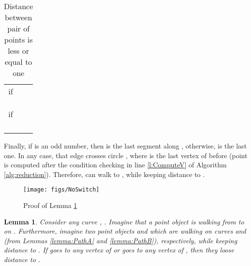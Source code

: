 \documentclass[12pt]{dalthesis}
\def\favoritefont{\bfseries \sffamily}
\def\QED{\ensuremath{{\Box}}}
\def\markatright#1{\leavevmode\unskip\nobreak\quad\hspace*{\fill}{#1}}
\newenvironment{proof}
	{\begin{trivlist}\item[\hskip\labelsep{\favoritefont Proof:}]}
	{\markatright{\QED}\end{trivlist}}
\newtheorem{lemma}[theorem]{Lemma}
\newcommand{\qed}{}
\begin{document}
\begin{proof}
\begin{table}[h]
\begin{tabular}{ r | l | l  }
if  &  				 		   &      \\
 &  &  \\
 &  &  \\


 &    &  \\







if  &  				
 		   &     \\
&  & \\
 & &  \\
 & &  \\
&   &  \\


\end{tabular}
\caption{Distance between pair of points is less or equal to one}
\label{tab:PathB}
\end{table}



Finally, if  is an odd number, then  
 is the last segment along , otherwise, 
 is the last one. In any case, 
that edge crosses  circle , where  is the last vertex of 
 before  (point  is computed after the condition checking 
in line \ref{l:ComputeV} of 
Algorithm \ref{alg:reduction}). Therefore, 
  can walk to , while keeping distance  to . 


\qed





\end{proof}




\begin{figure}
	\centering
	\texttt{[image: figs/NoSwitch]}
	\caption{Proof of Lemma \ref{lemma:NoSwitchFromAtoB}}
	\label{fig:noswitch}
\end{figure}

	



\begin{lemma}\label{lemma:NoSwitchFromAtoB}
Consider any curve , . Imagine that  
a point object  is walking from  to  on . Furthermore, imagine
two point objects  and  which are walking on curves  and  
(from Lemmas \ref{lemma:PathA} and \ref{lemma:PathB}), respectively,
while keeping distance  to . 
If  goes to any vertex of  or  goes to any vertex of , 
then they loose distance  to .

\end{lemma}
\end{document}
